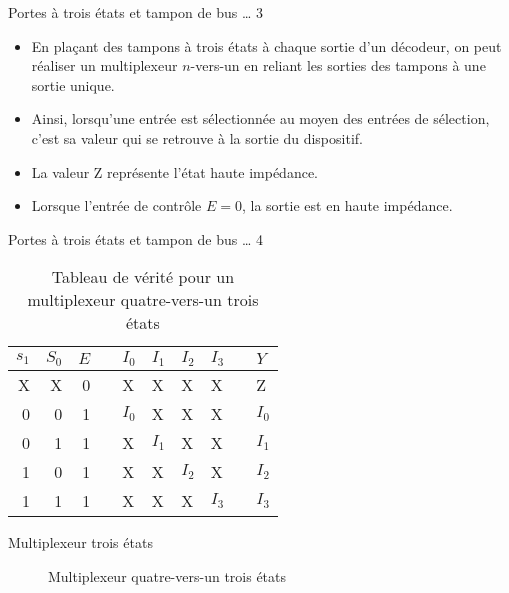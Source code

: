 \documentclass[presentation]{beamer}
\begin{document}
\begin{frame}[label={sec:org23936b9}]{Portes à trois états et tampon de bus \ldots{} 3}
\begin{itemize}
\item En plaçant des tampons à trois états à chaque sortie d'un décodeur, on peut réaliser un multiplexeur \(n\)-vers-un en reliant les sorties des tampons à une sortie unique.

\item Ainsi, lorsqu'une entrée est sélectionnée au moyen des entrées de sélection, c'est sa valeur qui se retrouve à la sortie du dispositif.

\item La valeur Z représente l'état haute impédance.

\item Lorsque l'entrée de contrôle \(E = 0\), la sortie est en haute impédance.
\end{itemize}
\end{frame}

\begin{frame}[label={sec:orgaf6a9ff}]{Portes à trois états et tampon de bus \ldots{} 4}
\begin{table}[htbp]
\caption{\label{tab:org1c2a7e3}Tableau de vérité pour un  multiplexeur quatre-vers-un trois états}
\centering
\begin{tabular}{rrrlllllll}
\(s_1\) & \(S_0\) & \(E\) &  & \(I_0\) & \(I_1\) & \(I_2\) & \(I_3\) &  & \(Y\)\\
\hline
X & X & 0 &  & X & X & X & X &  & Z\\
0 & 0 & 1 &  & \(I_0\) & X & X & X &  & \(I_0\)\\
0 & 1 & 1 &  & X & \(I_1\) & X & X &  & \(I_1\)\\
1 & 0 & 1 &  & X & X & \(I_2\) & X &  & \(I_2\)\\
1 & 1 & 1 &  & X & X & X & \(I_3\) &  & \(I_3\)\\
\end{tabular}
\end{table}
\end{frame}

\begin{frame}[label={sec:org90a7270}]{Multiplexeur trois états}
\begin{figure}[htbp]
\centering

\caption{\label{fig:org62bad22}Multiplexeur quatre-vers-un trois états}
\end{figure}
\end{frame}
\end{document}
